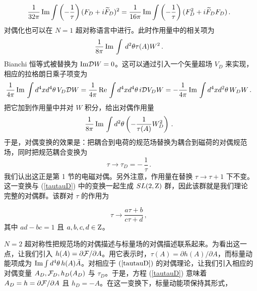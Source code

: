 $$
\frac{1}{32\pi}\,{\rm Im}\int \left(-\frac{1}{\tau}\right)
(F_D +i\widetilde F_D)^2=\frac{1}{16\pi}\,{\rm Im}\int\left(-\frac{1}{\tau}
\right) (F_D^2 +i\widetilde F_D F_D)\,.
$$
对偶化也可以在 $N=1$ 超对称语言中进行。此时作用量中的相关项为
$$
\frac{1}{8 \pi} \, {\rm Im} \, \int \, d^{2}\theta
\tau (A) W^{2}\,.
$$
Bianchi 恒等式被替换为 ${\rm Im}{\cal D}W = 0$。这可以通过引入一个矢量超场 $V_{D}$ 来实现，相应的拉格朗日乘子项变为
$$
\frac{1}{4\pi}\,{\rm Im}\,\int d^4x d^4\theta\, V_{D}{\cal D}W 
=\frac{1}{4 \pi}\,{\rm Re}\,\int d^4x d^4\theta\, i{\cal D}V_D W
=-\frac{1}{4\pi}\,{\rm Im}\,\int d^4x d^2\theta\, W_{D} W\,.
$$
把它加到作用量中并对 $W$ 积分，给出对偶作用量
$$
\frac{1}{8\pi}\,{\rm Im}\,\int d^2\theta \left(-\frac{1}{\tau(A)}
W^2_D \right)\,. 
$$
于是，对偶变换的效果是：把耦合到电荷的规范场替换为耦合到磁荷的对偶规范场，同时把规范耦合变换为
\begin{equation}
\tau\rightarrow\tau_D = -\,\frac{1}{\tau}\,.
\label{tautauD}
\end{equation}
我们认出这正是第 1 节的电磁对偶。另外注意，作用量在替换 $\tau\rightarrow\tau+1$ 下不变。这一变换与 (\ref{tautauD}) 中的变换一起生成 $SL(2,{\rm Z})$ 群，因此该群就是我们理论完整的对偶群。该群对 $\tau$ 的作用为

\begin{equation}
\tau\rightarrow{\frac{a\tau + b}{c\tau + d}}\,,
\label{tauSLtwoZ}
\end{equation}
其中 $ad-bc=1$ 且 $a,b,c,d \in {\rm Z}$。

$N=2$ 超对称性把规范场的对偶描述与标量场的对偶描述联系起来。为看出这一点，让我们引入 $h(A)=\partial{\cal F}/\partial A$。用它表示时，$\tau(A)=\partial h(A)/\partial A$，而标量动能项成为 ${\rm Im}\int d^4\theta\,h(A)\bar A$。对相应于 $(\ref{tautauD})$ 的对偶理论，让我们引入相应的对偶变量 $A_D,{\cal F}_D,h_D(A_D)$ 与 $\tau_D$。于是，方程 (\ref{tautauD}) 意味着 $A_D=h=\partial{\cal F}/\partial A$ 且 $h_D = -A$。在这一变换下，标量动能项保持其形式，

